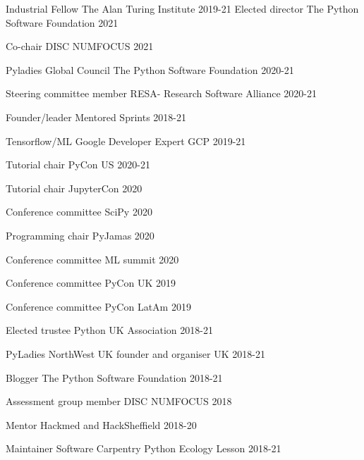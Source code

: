 


\begin{cvpress}

\cvpres
{Industrial Fellow}
{The Alan Turing Institute}
{2019-21}
\cvpres
{Elected director}
{The Python Software Foundation}
{2021}

\cvpres
{Co-chair}
{DISC NUMFOCUS}
{2021}

\cvpres
{Pyladies Global Council}
{The Python Software Foundation}
{2020-21}

\cvpres
{Steering committee member}
{RESA- Research Software Alliance}
{2020-21}

\cvpres
{Founder/leader}
{Mentored Sprints}
{2018-21}

\cvpres
{Tensorflow/ML Google Developer Expert}
{GCP}
{2019-21}

\cvpres
{Tutorial chair}
{PyCon US}
{2020-21}

\cvpres
{Tutorial chair}
{JupyterCon}
{2020}

\cvpres
{Conference committee}
{SciPy}
{2020}

\cvpres
{Programming chair}
{PyJamas}
{2020}

\cvpres
{Conference committee}
{ML summit}
{2020}

\cvpres
{Conference committee}
{PyCon UK}
{2019}

\cvpres
{Conference committee}
{PyCon LatAm}
{2019}

\cvpres
{Elected trustee} %
{Python UK Association}
{2018-21}

\cvpres
{PyLadies NorthWest UK founder and organiser} %
{UK}
{2018-21}

\cvpres
{Blogger} %
{The Python Software Foundation}
{2018-21}


\cvpres
{Assessment group member}
{DISC NUMFOCUS}
{2018}

\cvpres
{Mentor}
{Hackmed and HackSheffield}
{2018-20}

\cvpres
{Maintainer} %
{Software Carpentry Python Ecology Lesson}
{2018-21}


\end{cvpress}
